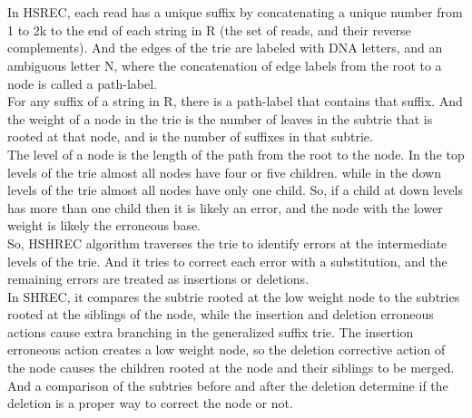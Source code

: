 \documentclass[12pt,openany]{llncs}
\begin{document}
\\
\\
In HSREC, each read has a unique suffix by concatenating a unique number from 1 to 2k to the end of each string in R (the set of reads, and their reverse complements). And the edges of the trie are labeled with DNA letters, and an ambiguous letter N, where the concatenation of edge labels from the root to a node is called a path-label. 
\\
For any suffix of a string in R, there is a path-label that contains that suffix. And the weight of a node in the trie is the number of leaves in the subtrie that is rooted at that node, and is the number of suffixes in that subtrie. 
\\
The level of a node is the length of the path from the root to the node. In the top levels of the trie almost all nodes have four or five children. while in the down levels of the trie almost all nodes have only one child. So, if a child at down levels has more than one child then it is likely an error, and the node with the lower weight is likely the erroneous base. 
\\
So, HSHREC algorithm traverses the trie to identify errors at the intermediate levels of the trie. And it tries to correct each error with a substitution, and the remaining errors are treated as insertions or deletions.
\\
In SHREC, it compares the subtrie rooted at the low weight node to the subtries rooted at the siblings of the node, while the insertion and deletion erroneous actions cause extra branching in the generalized suffix trie. The insertion erroneous action creates a low weight node, so the deletion corrective action of the node causes the children rooted at the node and their siblings to be merged. And a comparison of the subtries before and after the deletion determine if the deletion is a proper way to correct the node or not. 
\end{document}
